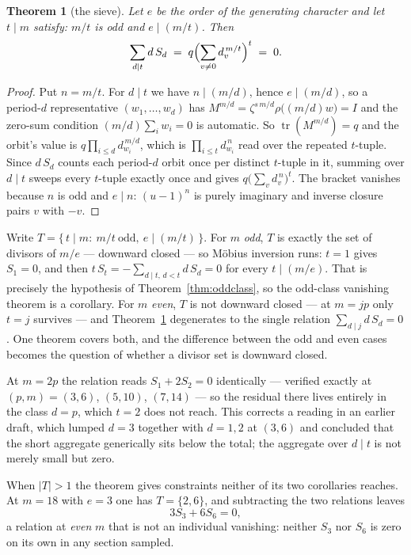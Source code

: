 \documentclass[11pt]{article}
\theoremstyle{plain}
\newtheorem{theorem}{Theorem}
\theoremstyle{definition}
\newcommand{\tr}{\operatorname{tr}}
\begin{document}
\begin{theorem}[the sieve]\label{thm:sieve}
Let $e$ be the order of the generating character and let $t\mid m$ satisfy:
$m/t$ is odd and $e\mid(m/t)$. Then
\[
\sum_{d\mid t} d\,S_d \;=\; q\Bigl(\sum_{v\neq0}d_v^{\,m/t}\Bigr)^{t}\;=\;0 .
\]
\end{theorem}

\begin{proof}
Put $n=m/t$. For $d\mid t$ we have $n\mid(m/d)$, hence $e\mid(m/d)$, so a
period-$d$ representative $(w_1,\dots,w_d)$ has
$M^{m/d}=\zeta^{s\,m/d}\rho\bigl((m/d)w\bigr)=I$ and the zero-sum condition
$(m/d)\sum_i w_i=0$ is automatic. So $\tr(M^{m/d})=q$ and the orbit's value is
$q\prod_{i\le d}d_{w_i}^{\,m/d}$, which is $\prod_{i\le t}d_{w_i}^{\,n}$ read
over the repeated $t$-tuple. Since $d\,S_d$ counts each period-$d$ orbit once
per distinct $t$-tuple in it, summing over $d\mid t$ sweeps every $t$-tuple
exactly once and gives $q\bigl(\sum_v d_v^{\,n}\bigr)^{t}$. The bracket
vanishes because $n$ is odd and $e\mid n$: $(u-1)^n$ is purely imaginary and
inverse closure pairs $v$ with $-v$.
\end{proof}

Write $T=\{\,t\mid m:\ m/t\ \text{odd},\ e\mid(m/t)\,\}$. For $m$ \emph{odd},
$T$ is exactly the set of divisors of $m/e$ --- downward closed --- so
M\"obius inversion runs: $t=1$ gives $S_1=0$, and then
$t\,S_t=-\sum_{d\mid t,\,d<t}d\,S_d=0$ for every $t\mid(m/e)$. That is
precisely the hypothesis of Theorem~\ref{thm:oddclass}, so the odd-class
vanishing theorem is a corollary. For $m$ \emph{even}, $T$ is not downward
closed --- at $m=jp$ only $t=j$ survives --- and Theorem~\ref{thm:sieve}
degenerates to the single relation $\sum_{d\mid j}d\,S_d=0$. One theorem covers
both, and the difference between the odd and even cases becomes the question of
whether a divisor set is downward closed.

At $m=2p$ the relation reads $S_1+2S_2=0$ identically --- verified exactly at
$(p,m)=(3,6)$, $(5,10)$, $(7,14)$ --- so the residual there lives entirely in
the class $d=p$, which $t=2$ does not reach. This corrects a reading in an
earlier draft, which lumped $d=3$ together with $d=1,2$ at $(3,6)$ and concluded
that the short aggregate generically sits below the total; the aggregate over
$d\mid t$ is not merely small but zero.

When $\lvert T\rvert>1$ the theorem gives constraints neither of its two
corollaries reaches. At $m=18$ with $e=3$ one has $T=\{2,6\}$, and subtracting
the two relations leaves
\[
3S_3+6S_6=0 ,
\]
a relation at \emph{even} $m$ that is not an individual vanishing: neither
$S_3$ nor $S_6$ is zero on its own in any section sampled.
\end{document}

